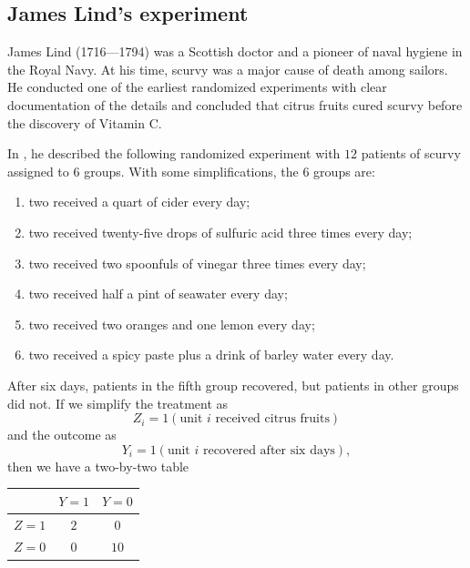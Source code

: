 \subsection{James Lind's experiment}\label{section::lind}


James Lind (1716---1794) was a Scottish doctor and a pioneer of naval hygiene in the Royal Navy. At his time,  scurvy was a major cause of death among sailors. He conducted one of the earliest randomized experiments with clear documentation of the details and concluded that citrus fruits cured scurvy before the discovery of Vitamin C. 


In \citet{lind1753treatise}, he described the following randomized experiment with $12$ patients of scurvy assigned to $6$ groups. With some simplifications, the $6$ groups are:
\begin{enumerate}
[(1)]
\item
two received a quart of cider every day; 

\item
two received twenty-five drops of sulfuric acid three times every day;

\item
two received two spoonfuls of vinegar three times every day;

\item
two received half a pint of seawater every day;


\item
two received two oranges and one lemon every day;

\item 
two received a spicy paste plus a drink of barley water every day.
\end{enumerate}

After six days, patients in the fifth group recovered, but patients in other groups did not. If we simplify the treatment as
$$
Z_i  = 1(\text{unit } i \text{ received citrus fruits})
$$
and the outcome as
$$
Y_i = 1(\text{unit } i \text{ recovered after six days}),
$$
then we have a two-by-two table

\begin{center}
\begin{tabular}{lcc}
\hline 
      & $Y =1$ & $Y =0$\\\hline
$Z =1$ & $2$ & $0$\\ 
$Z =0$ & $0$ & $10$\\
\hline 
\end{tabular}
\end{center}


